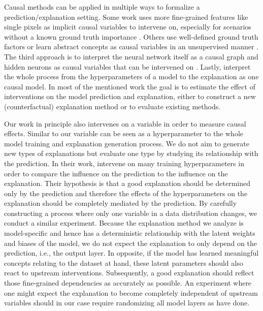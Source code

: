 Causal methods can be applied in multiple ways to formalize a prediction/explanation setting.
Some work uses more fine-grained features like single pixels as implicit causal variables to intervene on, especially for scenarios without a known ground truth importance \citep{Zeiler2013,Fong2017,Samek2017a}. Others use well-defined ground truth factors or learn abstract concepts as causal variables in an unsupervised manner \citep{Parafita2019, Goyal2019, Tran2022, Reimers2019, Reimers2020, Harradon2018}. The third approach is to interpret the neural network itself as a causal graph and hidden neurons as causal variables that can be intervened on \citep{Narendra2018, Chattopadhyay2019}. Lastly, \cite{Karimi2023} interpret the whole process from the hyperparameters of a model to the explanation as one causal model. In most of the mentioned work the goal is to estimate the effect of interventions on the model prediction and explanation, either to construct a new (counterfactual) explanation method or to evaluate existing methods.

Our work in principle also intervenes on a variable in order to measure causal effects. Similar to \cite{Karimi2023} our variable can be seen as a hyperparameter to the whole model training and explanation generation process. We do not aim to generate new types of explanations but evaluate one type by studying its relationship with the prediction. In their work, \citet{Karimi2023} intervene on many training hyperparameters in order to compare the influence on the prediction to the influence on the explanation. Their hypothesis is that a good explanation should be determined only by the prediction and therefore the effects of the hyperparameters on the explanation should be completely mediated by the prediction. By carefully constructing a process where only one variable in a data distribution changes, we conduct a similar experiment. Because the explanation method we analyze is model-specific and hence has a deterministic relationship with the latent weights and biases of the model, we do not expect the explanation to only depend on the prediction, i.e., the output layer. In opposite, if the model has learned meaningful concepts relating to the dataset at hand, these latent parameters should also react to upstream interventions. Subsequently, a good explanation should reflect those fine-grained dependencies as accurately as possible. An experiment where one might expect the explanation to become completely independent of upstream variables should in our case require randomizing all model layers as \cite{Adebayo2018} have done. 
